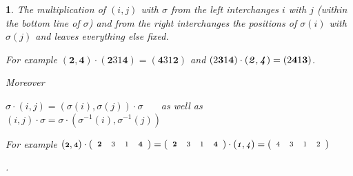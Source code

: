 \documentclass[a4 paper,12pt]{article}
\newtheorem{numeris}{}[section]
\begin{document}
\begin{numeris} 
The multiplication of $(i,j)$ with $\sigma$ from the left  interchanges  $i$ with $j$ (within the bottom line of $\sigma$) and from the right interchanges the positions of $\sigma(i)$ with $\sigma(j)$ and leaves everything else fixed.  
\begin{small}For  example $ (\textbf{2},\textbf{4})\cdot \left(
       \textbf{2}31 \textbf{4}
\right) = \left(
       \textbf{4}31 \textbf{2}
\right)$ and $ \left(
       2\textbf{3}1 \textbf{4}
\right)\cdot  (\textbf{\textit{2}},\textbf{\textit{4}}) =\left(
       2\textbf{4}1 \textbf{3}
\right)$. \end{small} Moreover 
\begin{center}
$\sigma \cdot  (i,j) = (\sigma(i), \sigma(j)) \cdot  \sigma$ \  \  \  as well as \  \  \  $(i,j) \cdot  \sigma  =  \sigma \cdot  (\sigma^{-1}(i), \sigma^{-1}(j)) $
\end{center}
\begin{small}For  example $\begin{scriptsize} (\textbf{2},\textbf{4})\cdot \left(
\begin{array}{ccccc}
       \textbf{2}&3&1& \textbf{4}
\end{array}
\right) = \left(
\begin{array}{ccccc}
       \textbf{2}&3&1& \textbf{4}
\end{array}
\right)\cdot  (\textbf{\textit{1}},\textbf{\textit{4}}) = \left(
\begin{array}{ccccc}
       4&3&1& 2
\end{array}
\right) \end{scriptsize}$ \end{small}.
\label{non_com} 
\end{numeris}
\end{document}
